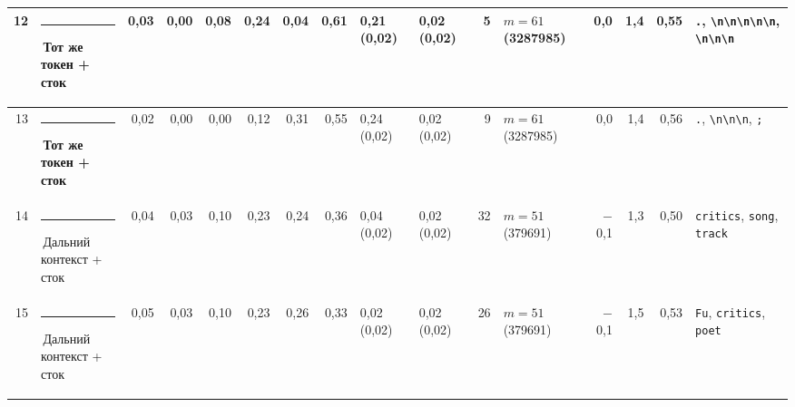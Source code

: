 \documentclass[10pt]{article}
\begin{document}
\begin{minipage}{\linewidth}
\begin{center}
{\begin{tabular}{|r|l|r|r|r|r|r|r|l|l|r|l|r|r|r|l|}
12 & \textcolor[HTML]{E87BA4}{\rule{0.62em}{0.62em}}\,\textbf{Тот же токен + сток} & 0,03 & 0,00 & 0,08 & 0,24 & 0,04 & 0,61 & 0,21 (0,02) & 0,02 (0,02) & 5 & $m{=}61$ (3287985) & 0,0 & 1,4 & 0,55 & \texttt{\textvisiblespace{}.}, \texttt{\textvisiblespace{}\textbackslash{}n\textbackslash{}n\textbackslash{}n\textbackslash{}n\textbackslash{}n}, \texttt{\textvisiblespace{}\textbackslash{}n\textbackslash{}n\textbackslash{}n} \\ \hline
13 & \textcolor[HTML]{E87BA4}{\rule{0.62em}{0.62em}}\,\textbf{Тот же токен + сток} & 0,02 & 0,00 & 0,00 & 0,12 & 0,31 & 0,55 & 0,24 (0,02) & 0,02 (0,02) & 9 & $m{=}61$ (3287985) & 0,0 & 1,4 & 0,56 & \texttt{\textvisiblespace{}.}, \texttt{\textvisiblespace{}\textbackslash{}n\textbackslash{}n\textbackslash{}n}, \texttt{\textvisiblespace{};} \\ \hline
14 & \textcolor[HTML]{C3C2B7}{\rule{0.62em}{0.62em}}\,Дальний контекст + сток & 0,04 & 0,03 & 0,10 & 0,23 & 0,24 & 0,36 & 0,04 (0,02) & 0,02 (0,02) & 32 & $m{=}51$ (379691) & $-$0,1 & 1,3 & 0,50 & \texttt{\textvisiblespace{}critics}, \texttt{\textvisiblespace{}song}, \texttt{\textvisiblespace{}track} \\ \hline
15 & \textcolor[HTML]{C3C2B7}{\rule{0.62em}{0.62em}}\,Дальний контекст + сток & 0,05 & 0,03 & 0,10 & 0,23 & 0,26 & 0,33 & 0,02 (0,02) & 0,02 (0,02) & 26 & $m{=}51$ (379691) & $-$0,1 & 1,5 & 0,53 & \texttt{\textvisiblespace{}Fu}, \texttt{\textvisiblespace{}critics}, \texttt{\textvisiblespace{}poet} \\ \hline
\hline\end{tabular}}\end{center}
\end{minipage}
\par\vspace{0.4em}
\end{document}
